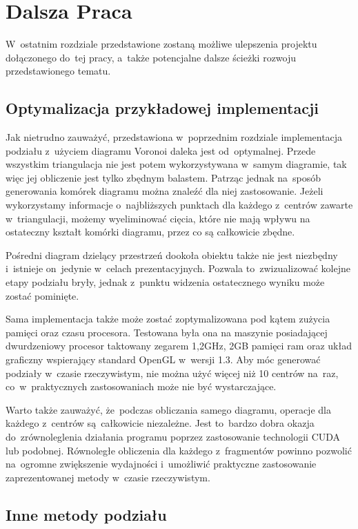 \documentclass[skorowidz,autorrok,backref,xodstep,oswiadczenie]{wmimgr}
\begin{document}
\chapter{Dalsza Praca}

W~ostatnim rozdziale przedstawione zostaną możliwe ulepszenia projektu dołączonego do~tej pracy, a~także potencjalne dalsze ścieżki rozwoju przedstawionego tematu.

\section{Optymalizacja przykładowej implementacji}

Jak nietrudno zauważyć, przedstawiona w~poprzednim rozdziale implementacja podziału z~użyciem diagramu Voronoi daleka jest od~optymalnej. Przede wszystkim triangulacja nie jest potem wykorzystywana w~samym diagramie, tak więc jej obliczenie jest tylko zbędnym balastem. Patrząc jednak na~sposób generowania komórek diagramu można znaleźć dla niej zastosowanie. Jeżeli wykorzystamy informacje o~najbliższych punktach dla każdego z~centrów zawarte w~triangulacji, możemy wyeliminować cięcia, które nie mają wpływu na ostateczny kształt komórki diagramu, przez co są całkowicie zbędne.

Pośredni diagram dzielący przestrzeń dookoła obiektu także nie jest niezbędny i~istnieje on~jedynie w~celach prezentacyjnych. Pozwala to~zwizualizować kolejne etapy podziału bryły, jednak z~punktu widzenia ostatecznego wyniku może zostać pominięte.

Sama implementacja także może zostać zoptymalizowana pod kątem zużycia pamięci oraz czasu procesora. Testowana była ona na maszynie posiadającej dwurdzeniowy procesor taktowany zegarem 1,2GHz, 2GB pamięci ram oraz układ graficzny wspierający standard OpenGL w~wersji 1.3. Aby móc generować podziały w~czasie rzeczywistym, nie można użyć więcej niż 10 centrów na~raz, co~w~praktycznych zastosowaniach może nie być wystarczające.

Warto także zauważyć, że~podczas obliczania samego diagramu, operacje dla każdego z~centrów są~całkowicie niezależne. Jest to~bardzo dobra okazja do~zrównoleglenia działania programu poprzez zastosowanie technologii CUDA lub podobnej. Równoległe obliczenia dla każdego z~fragmentów powinno pozwolić na~ogromne zwiększenie wydajności i~umożliwić praktyczne zastosowanie zaprezentowanej metody w~czasie rzeczywistym.

\section{Inne metody podziału}
\end{document}
